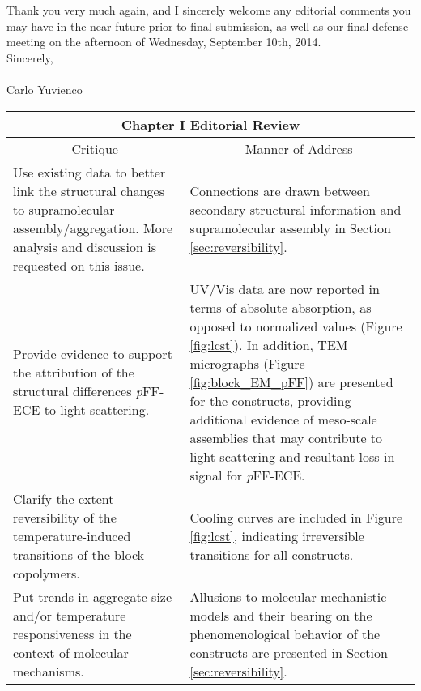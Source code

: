Thank you very much again, and I sincerely welcome any editorial comments you
may have in the near future prior to final submission, as well as our
final defense meeting on the afternoon of Wednesday, September 10th, 2014.
\hspace{0pt}\\
Sincerely,
\hspace{0pt}\\
\hspace{0pt}\\
Carlo Yuvienco

\begin{landscape}
\renewcommand{\arraystretch}{1.5}
\begin{table}[h!]
    \centering
    \begin{tabular}{ p{} p{} }
    \hline
    \multicolumn{2}{c}{Chapter I Editorial Review} \\
    \hline
    \multicolumn{1}{c}{Critique} &
    \multicolumn{1}{c}{Manner of Address} \\
    \hline
    
    Use existing data to better link the structural changes to supramolecular
    assembly/aggregation. More analysis and discussion is requested on this
    issue.
    &
    Connections are drawn between secondary structural information and
    supramolecular assembly in Section \ref{sec:reversibility}.
    \\

    Provide evidence to support the attribution of the structural differences
    \emph{p}FF-ECE to light scattering.
    &
    UV/Vis data are now reported in terms of absolute absorption, as opposed to
    normalized values (Figure \ref{fig:lcst}). In addition, TEM micrographs
    (Figure \ref{fig:block_EM_pFF}) are presented for the constructs, providing
    additional evidence of meso-scale assemblies that may contribute to light
    scattering and resultant loss in signal for \emph{p}FF-ECE.
    \\

    Clarify the extent reversibility of the temperature-induced transitions of
    the block copolymers.
    &
    Cooling curves are included in Figure \ref{fig:lcst}, indicating irreversible
    transitions for all constructs.
    \\

    Put trends in aggregate size and/or temperature responsiveness in the
    context of molecular mechanisms.
    &
    Allusions to molecular mechanistic models and their bearing on the
    phenomenological behavior of the constructs are presented in Section
    \ref{sec:reversibility}.
    \\


\end{tabular}
\end{table}
\end{landscape}
